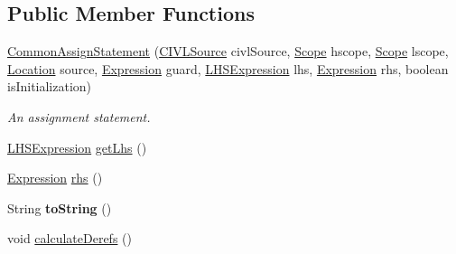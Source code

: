 \subsection*{Public Member Functions}
\begin{DoxyCompactItemize}
\item 
\hyperlink{classedu_1_1udel_1_1cis_1_1vsl_1_1civl_1_1model_1_1common_1_1statement_1_1CommonAssignStatement_a55ad81e9d3932fe6e874b6168cb365c2}{Common\+Assign\+Statement} (\hyperlink{interfaceedu_1_1udel_1_1cis_1_1vsl_1_1civl_1_1model_1_1IF_1_1CIVLSource}{C\+I\+V\+L\+Source} civl\+Source, \hyperlink{interfaceedu_1_1udel_1_1cis_1_1vsl_1_1civl_1_1model_1_1IF_1_1Scope}{Scope} hscope, \hyperlink{interfaceedu_1_1udel_1_1cis_1_1vsl_1_1civl_1_1model_1_1IF_1_1Scope}{Scope} lscope, \hyperlink{interfaceedu_1_1udel_1_1cis_1_1vsl_1_1civl_1_1model_1_1IF_1_1location_1_1Location}{Location} source, \hyperlink{interfaceedu_1_1udel_1_1cis_1_1vsl_1_1civl_1_1model_1_1IF_1_1expression_1_1Expression}{Expression} guard, \hyperlink{interfaceedu_1_1udel_1_1cis_1_1vsl_1_1civl_1_1model_1_1IF_1_1expression_1_1LHSExpression}{L\+H\+S\+Expression} lhs, \hyperlink{interfaceedu_1_1udel_1_1cis_1_1vsl_1_1civl_1_1model_1_1IF_1_1expression_1_1Expression}{Expression} rhs, boolean is\+Initialization)
\begin{DoxyCompactList}\small\item\em An assignment statement. \end{DoxyCompactList}\item 
\hyperlink{interfaceedu_1_1udel_1_1cis_1_1vsl_1_1civl_1_1model_1_1IF_1_1expression_1_1LHSExpression}{L\+H\+S\+Expression} \hyperlink{classedu_1_1udel_1_1cis_1_1vsl_1_1civl_1_1model_1_1common_1_1statement_1_1CommonAssignStatement_a6829f40b533365811008b9490b3aceb1}{get\+Lhs} ()
\item 
\hyperlink{interfaceedu_1_1udel_1_1cis_1_1vsl_1_1civl_1_1model_1_1IF_1_1expression_1_1Expression}{Expression} \hyperlink{classedu_1_1udel_1_1cis_1_1vsl_1_1civl_1_1model_1_1common_1_1statement_1_1CommonAssignStatement_a0f60fbf78c26d0287e357b1d90e627f4}{rhs} ()
\item 
\hypertarget{classedu_1_1udel_1_1cis_1_1vsl_1_1civl_1_1model_1_1common_1_1statement_1_1CommonAssignStatement_a0f29365ccc142939eb35e595b4ab108d}{}String {\bfseries to\+String} ()\label{classedu_1_1udel_1_1cis_1_1vsl_1_1civl_1_1model_1_1common_1_1statement_1_1CommonAssignStatement_a0f29365ccc142939eb35e595b4ab108d}

\item 
\hypertarget{classedu_1_1udel_1_1cis_1_1vsl_1_1civl_1_1model_1_1common_1_1statement_1_1CommonAssignStatement_aa2d1ee280458666a691403ba1ee4bbae}{}void \hyperlink{classedu_1_1udel_1_1cis_1_1vsl_1_1civl_1_1model_1_1common_1_1statement_1_1CommonAssignStatement_aa2d1ee280458666a691403ba1ee4bbae}{calculate\+Derefs} ()\label{classedu_1_1udel_1_1cis_1_1vsl_1_1civl_1_1model_1_1common_1_1statement_1_1CommonAssignStatement_aa2d1ee280458666a691403ba1ee4bbae}


\end{DoxyCompactItemize}
